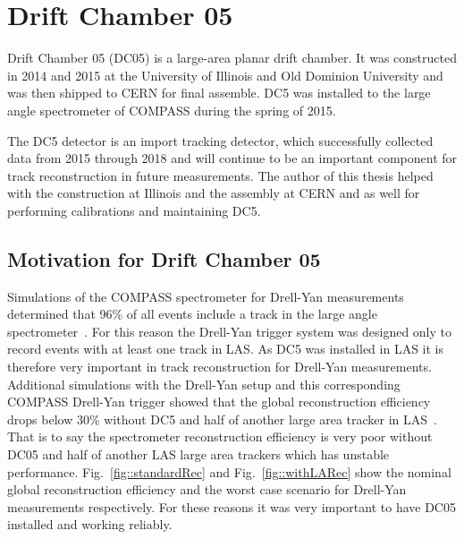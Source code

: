 \chapter{Drift Chamber 05} \label{ch::dc05}
\ifpdf
\graphicspath{{Chapters/DC5/Figs/Raster/}{Chapters/DC5/Figs/PDF/}{Chapters/DC5/Figs/}}
\else \graphicspath{{Chapters/DC5/Figs/Vector/}{Chapters/DC5/Figs/}}
\fi

Drift Chamber 05 (DC05) is a large-area planar drift chamber.  It was
constructed in 2014 and 2015 at the University of Illinois and Old Dominion
University and was then shipped to CERN for final assemble.  DC5 was installed
to the large angle spectrometer of COMPASS during the spring of 2015.

The DC5 detector is an import tracking detector, which successfully collected
data from 2015 through 2018 and will continue to be an important component for
track reconstruction in future measurements.  The author of this thesis helped
with the construction at Illinois and the assembly at CERN and as well for
performing calibrations and maintaining DC5.


\section{Motivation for Drift Chamber 05}

Simulations of the COMPASS spectrometer for Drell-Yan measurements determined
that 96\% of all events include a track in the large angle
spectrometer~\cite{proposal}.  For this reason the Drell-Yan trigger system was
designed only to record events with at least one track in LAS.  As DC5 was
installed in LAS it is therefore very important in track reconstruction for
Drell-Yan measurements.  Additional simulations with the Drell-Yan setup and
this corresponding COMPASS Drell-Yan trigger showed that the global
reconstruction efficiency drops below 30\% without DC5 and half of another large
area tracker in LAS~\cite{quintans_rec_march12}.  That is to say the
spectrometer reconstruction efficiency is very poor without DC05 and half of
another LAS large area trackers which has unstable performance.
Fig.~\ref{fig::standardRec} and Fig.~\ref{fig::withLARec} show the nominal
global reconstruction efficiency and the worst case scenario for Drell-Yan
measurements respectively.  For these reasons it was very important to have DC05
installed and working reliably.

